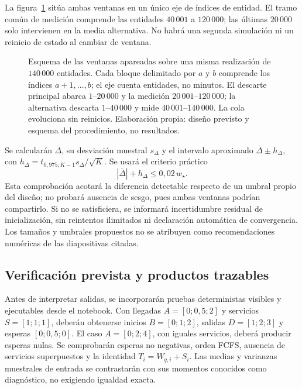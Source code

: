 La figura~\ref{fig:ventanas-medicion} sitúa ambas ventanas en un único eje de índices de entidad. El tramo común de medición comprende las entidades $40\,001$ a $120\,000$; las últimas $20\,000$ solo intervienen en la media alternativa. No habrá una segunda simulación ni un reinicio de estado al cambiar de ventana.

\begin{figure}[htbp]
  \centering
  
  \caption{Esquema de las ventanas apareadas sobre una misma realización de $140\,000$ entidades. Cada bloque delimitado por $a$ y $b$ comprende los índices $a+1,\ldots,b$; el eje cuenta entidades, no minutos. El descarte principal abarca $1$--$20\,000$ y la medición $20\,001$--$120\,000$; la alternativa descarta $1$--$40\,000$ y mide $40\,001$--$140\,000$. La cola evoluciona sin reinicios. Elaboración propia: diseño previsto y esquema del procedimiento, no resultados.}
  \label{fig:ventanas-medicion}
\end{figure}

Se calcularán $\overline{\Delta}$, su desviación muestral $s_\Delta$ y el intervalo aproximado $\overline{\Delta}\pm h_\Delta$, con $h_\Delta=t_{0{,}975;K-1}s_\Delta/\sqrt{K}$. Se usará el criterio práctico
\begin{equation}
  |\overline{\Delta}|+h_\Delta\leq 0{,}02\,w_\star.
  \label{eq:metodo-sensibilidad}
\end{equation}
Esta comprobación acotará la diferencia detectable respecto de un umbral propio del diseño; no probará ausencia de sesgo, pues ambas ventanas podrían compartirlo. Si no se satisficiera, se informará incertidumbre residual de inicialización, sin reintentos ilimitados ni declaración automática de convergencia. Los tamaños y umbrales propuestos no se atribuyen como recomendaciones numéricas de las diapositivas citadas.

\subsection{Verificación prevista y productos trazables}
\label{subsec:metodo-verificacion}

Antes de interpretar salidas, se incorporarán pruebas deterministas visibles y ejecutables desde el notebook. Con llegadas $A=[0;0{,}5;2]$ y servicios $S=[1;1;1]$, deberán obtenerse inicios $B=[0;1;2]$, salidas $D=[1;2;3]$ y esperas $[0;0{,}5;0]$. El caso $A=[0;2;4]$, con iguales servicios, deberá producir esperas nulas. Se comprobarán esperas no negativas, orden FCFS, ausencia de servicios superpuestos y la identidad $T_i=W_{q,i}+S_i$. Las medias y varianzas muestrales de entrada se contrastarán con sus momentos conocidos como diagnóstico, no exigiendo igualdad exacta.

